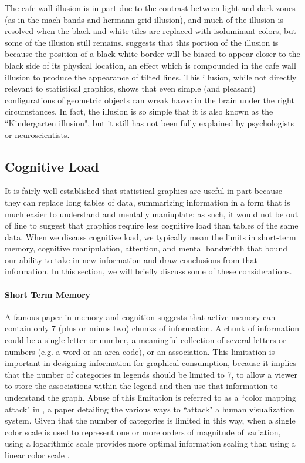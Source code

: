 \documentclass[11pt]{isuthesis}\usepackage[]{graphicx}\usepackage[]{color}
\begin{document}
The cafe wall illusion is in part due to the contrast between light and dark zones (as in the mach bands and hermann grid illusion), and much of the illusion is resolved when the black and white tiles are replaced with isoluminant colors, but some of the illusion still remains. \citet{westheimer2007irradiation} suggests that this portion of the illusion is because the position of a black-white border will be biased to appear closer to the black side of its physical location, an effect which is compounded in the cafe wall illusion to produce the appearance of tilted lines. This illusion, while not directly relevant to statistical graphics, shows that even simple (and pleasant) configurations of geometric objects can wreak havoc in the brain under the right circumstances. In fact, the illusion is so simple that it is also known as the ``Kindergarten illusion", but it still has not been fully explained by psychologists or neuroscientists. 

\subsection{Cognitive Load}\label{cognitiveload}
It is fairly well established that statistical graphics are useful in part because they can replace long tables of data, summarizing information in a form that is much easier to understand and mentally maniuplate; as such, it would not be out of line to suggest that graphics require less cognitive load than tables of the same data. When we discuss cognitive load, we typically mean the limits in short-term memory, cognitive manipulation, attention, and mental bandwidth that bound our ability to take in new information and draw conclusions from that information. In this section, we will briefly discuss some of these considerations. 

\paragraph{Short Term Memory} A famous paper in memory and cognition \citep{miller1956magical} suggests that active memory can contain only 7 (plus or minus two) chunks of information. A chunk of information could be a single letter or number, a meaningful collection of several letters or numbers (e.g. a word or an area code), or an association. This limitation is important in designing information for graphical consumption, because it implies that the number of categories in legends should be limited to 7, to allow a viewer to store the associations within the legend and then use that information to understand the graph. Abuse of this limitation is referred to as a ``color mapping attack" in \citet{conti2005attacking}, a paper detailing the various ways to ``attack" a human visualization system. Given that the number of categories is limited in this way, when a single color scale is used to represent one or more orders of magnitude of variation, using a logarithmic scale provides more optimal information scaling than using a linear color scale \citep{sun2012framework, varshney2013we}. 
\end{document}
